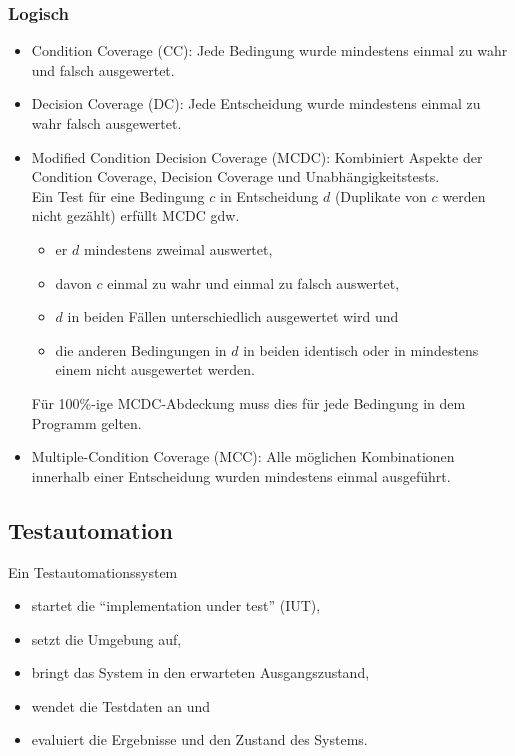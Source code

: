 \documentclass[
    ngerman,
    color=3b,
    summary,
    boxarc,
    main,
]{rubos-tuda-template}
\begin{document}
\subsubsection{Logisch}\begin{itemize}
    \item Condition Coverage (CC): Jede Bedingung wurde mindestens einmal zu wahr und falsch ausgewertet.
    \item Decision Coverage (DC): Jede Entscheidung wurde mindestens einmal zu wahr falsch ausgewertet.
    \item Modified Condition Decision Coverage (MCDC): Kombiniert Aspekte der Condition Coverage, Decision Coverage und Unabhängigkeitstests.\\
          Ein Test für eine Bedingung $ c $ in Entscheidung $ d $ (Duplikate von $ c $ werden nicht gezählt) erfüllt MCDC gdw.
          \begin{itemize}
              \item er $ d $ mindestens zweimal auswertet,
              \item davon $ c $ einmal zu wahr und einmal zu falsch auswertet,
              \item $ d $ in beiden Fällen unterschiedlich ausgewertet wird und
              \item die anderen Bedingungen in $ d $ in beiden identisch oder in mindestens einem nicht ausgewertet werden.
          \end{itemize}
          Für 100\%-ige MCDC-Abdeckung muss dies für jede Bedingung in dem Programm gelten.
    \item Multiple-Condition Coverage (MCC): Alle möglichen Kombinationen innerhalb einer Entscheidung wurden mindestens einmal ausgeführt.
\end{itemize}
\clearpage
\subsection{Testautomation}
Ein Testautomationssystem
\begin{itemize}
    \item startet die \enquote{implementation under test} (IUT),
    \item setzt die Umgebung auf,
    \item bringt das System in den erwarteten Ausgangszustand,
    \item wendet die Testdaten an und
    \item evaluiert die Ergebnisse und den Zustand des Systems.
\end{itemize}
\end{document}
